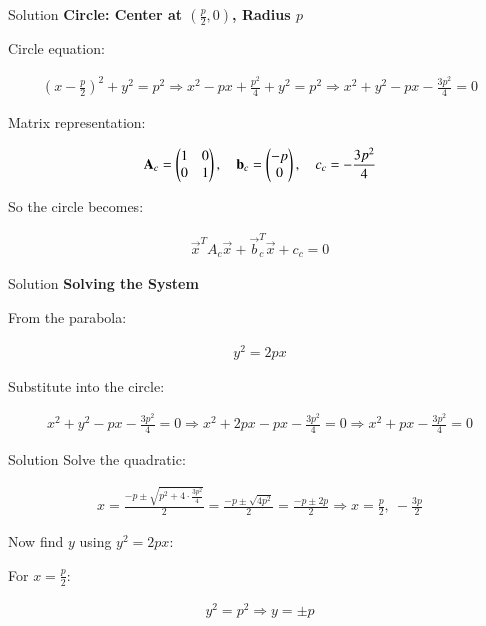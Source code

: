 \documentclass{beamer}
\begin{document}
\begin{frame}{Solution}
\textbf{Circle: Center at $(\frac{p}{2}, 0)$, Radius $p$}

Circle equation:


\begin{align}
(x - \frac{p}{2})^2 + y^2 = p^2
\Rightarrow x^2 - px + \frac{p^2}{4} + y^2 = p^2
\Rightarrow x^2 + y^2 - px - \frac{3p^2}{4} = 0
\end{align}



Matrix representation:


\begin{align}
\mathbf{A}_c = \begin{pmatrix}1 & 0 \\ 0 & 1\end{pmatrix}, \quad
\mathbf{b}_c = \begin{pmatrix}-p \\ 0\end{pmatrix}, \quad
c_c = -\frac{3p^2}{4}
\end{align}



So the circle becomes:


\begin{align}
\vec{x}^T A_c \vec{x} + \vec{b}_c^T \vec{x} + c_c = 0
\end{align}
\end{frame}


\begin{frame}{Solution}
\textbf{Solving the System}

From the parabola:


\begin{align}
y^2 = 2px
\end{align}



Substitute into the circle:


\begin{align}
x^2 + y^2 - px - \frac{3p^2}{4} = 0
\Rightarrow x^2 + 2px - px - \frac{3p^2}{4} = 0
\Rightarrow x^2 + px - \frac{3p^2}{4} = 0
\end{align}
\end{frame}

\begin{frame}{Solution}
Solve the quadratic:


\begin{align}
x = \frac{-p \pm \sqrt{p^2 + 4 \cdot \frac{3p^2}{4}}}{2}
= \frac{-p \pm \sqrt{4p^2}}{2}
= \frac{-p \pm 2p}{2}
\Rightarrow x = \frac{p}{2},\ -\frac{3p}{2}
\end{align}



Now find $y$ using $y^2 = 2px$:

For $x = \frac{p}{2}$:


\begin{align}
y^2 = p^2 \Rightarrow y = \pm p
\end{align}
\end{frame}
\end{document}
